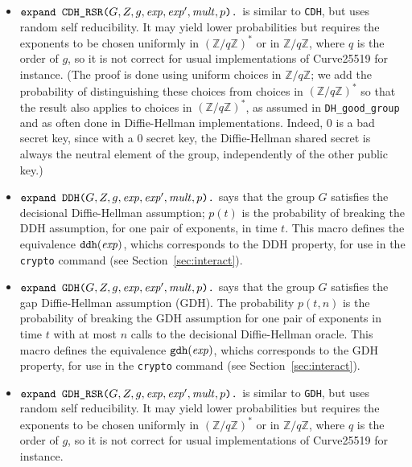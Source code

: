 \documentclass{article}
\begin{document}
\begin{itemize}
\begin{itemize}
\begin{itemize}
     \item $\texttt{expand\ CDH\_RSR(}G, Z, g, \mathit{exp}, \mathit{exp}', \mathit{mult}, p\texttt{).}$ 
       is similar to \texttt{CDH}, but uses random self reducibility. It may yield lower probabilities but requires the exponents 
       to be chosen uniformly in $(\mathbb{Z}/q\mathbb{Z})^*$ or in $\mathbb{Z}/q\mathbb{Z}$, where $q$ is the order of $g$, 
       so it is not correct for usual implementations of Curve25519 for instance. (The proof is done using uniform choices in $\mathbb{Z}/q\mathbb{Z}$; we add the probability of distinguishing these choices from choices in $(\mathbb{Z}/q\mathbb{Z})^*$ so that the result also applies to choices in $(\mathbb{Z}/q\mathbb{Z})^*$, as assumed in \texttt{DH\_good\_group} and as often done in Diffie-Hellman implementations. Indeed, 0 is a bad secret key, since with a 0 secret key, the Diffie-Hellman shared secret is always the neutral element of the group, independently of the other public key.)

     \item $\texttt{expand\ DDH(}G, Z, g, \mathit{exp}, \mathit{exp}', \mathit{mult}, p\texttt{).}$
       says that the group $G$ satisfies the decisional Diffie-Hellman
       assumption; $p(t)$ is the probability of breaking the DDH
       assumption, for one pair of exponents, in time $t$.
   This macro defines the equivalence $\texttt{ddh}(\mathit{exp})$, whichs corresponds to the DDH property, for use in the
   \texttt{crypto} command (see Section~\ref{sec:interact}).

     \item $\texttt{expand\ GDH(}G, Z, g, \mathit{exp}, \mathit{exp}', \mathit{mult}, p\texttt{).}$
       says that the group $G$ satisfies the gap Diffie-Hellman
       assumption (GDH). The probability $p(t,n)$ is the probability of breaking
       the GDH assumption for one pair of exponents in time $t$ with at most $n$ 
       calls to the decisional Diffie-Hellman oracle. This macro defines
       the equivalence $\texttt{gdh}(\mathit{exp})$, whichs corresponds to the GDH property, for use in the
       \texttt{crypto} command (see Section~\ref{sec:interact}).

     \item $\texttt{expand\ GDH\_RSR(}G, Z, g, \mathit{exp}, \mathit{exp}', \mathit{mult}, p\texttt{).}$ 
       is similar to \texttt{GDH}, but uses random self reducibility. It may yield lower probabilities but requires the exponents 
       to be chosen uniformly in $(\mathbb{Z}/q\mathbb{Z})^*$ or in $\mathbb{Z}/q\mathbb{Z}$, where $q$ is the order of $g$, 
       so it is not correct for usual implementations of Curve25519 for instance.


\end{itemize}
\end{itemize}
\end{itemize}
\end{document}
